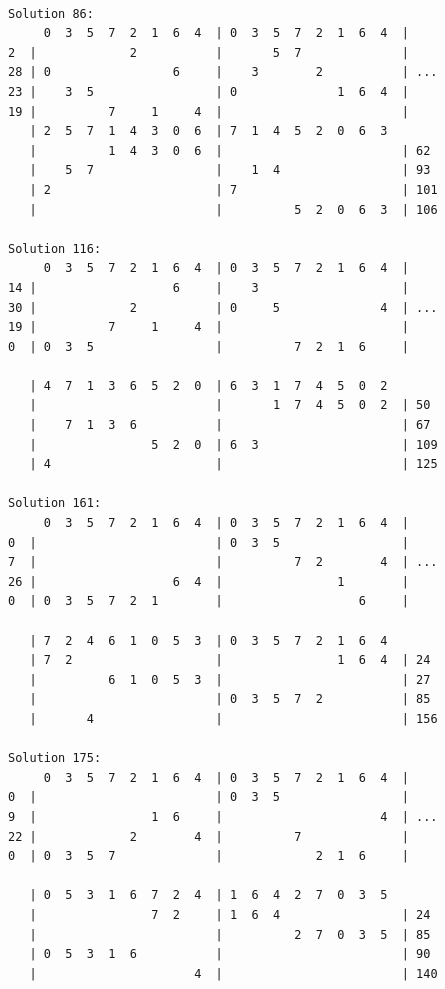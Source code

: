 \begin{lstlisting}[basicstyle=\ttfamily\footnotesize,numbers=none,caption={Output of Listing~\ref{writeSolutions} for problem size four and row $\{0, 3, 5, 7, 2, 1, 6, 4\}$.},label={list:quartet}]

Solution 86:
     0  3  5  7  2  1  6  4  | 0  3  5  7  2  1  6  4  |
2  |             2           |       5  7              |
28 | 0                 6     |    3        2           | ...
23 |    3  5                 | 0              1  6  4  |
19 |          7     1     4  |                         |
   | 2  5  7  1  4  3  0  6  | 7  1  4  5  2  0  6  3  
   |          1  4  3  0  6  |                         | 62
   |    5  7                 |    1  4                 | 93
   | 2                       | 7                       | 101
   |                         |          5  2  0  6  3  | 106

Solution 116:
     0  3  5  7  2  1  6  4  | 0  3  5  7  2  1  6  4  |
14 |                   6     |    3                    |
30 |             2           | 0     5              4  | ...
19 |          7     1     4  |                         |
0  | 0  3  5                 |          7  2  1  6     |

   | 4  7  1  3  6  5  2  0  | 6  3  1  7  4  5  0  2  
   |                         |       1  7  4  5  0  2  | 50
   |    7  1  3  6           |                         | 67
   |                5  2  0  | 6  3                    | 109
   | 4                       |                         | 125

Solution 161:
     0  3  5  7  2  1  6  4  | 0  3  5  7  2  1  6  4  |
0  |                         | 0  3  5                 |
7  |                         |          7  2        4  | ...
26 |                   6  4  |                1        |
0  | 0  3  5  7  2  1        |                   6     |

   | 7  2  4  6  1  0  5  3  | 0  3  5  7  2  1  6  4  
   | 7  2                    |                1  6  4  | 24
   |          6  1  0  5  3  |                         | 27
   |                         | 0  3  5  7  2           | 85
   |       4                 |                         | 156

Solution 175:
     0  3  5  7  2  1  6  4  | 0  3  5  7  2  1  6  4  |
0  |                         | 0  3  5                 |
9  |                1  6     |                      4  | ...
22 |             2        4  |          7              |
0  | 0  3  5  7              |             2  1  6     |

   | 0  5  3  1  6  7  2  4  | 1  6  4  2  7  0  3  5  
   |                7  2     | 1  6  4                 | 24
   |                         |          2  7  0  3  5  | 85
   | 0  5  3  1  6           |                         | 90
   |                      4  |                         | 140
\end{lstlisting}

